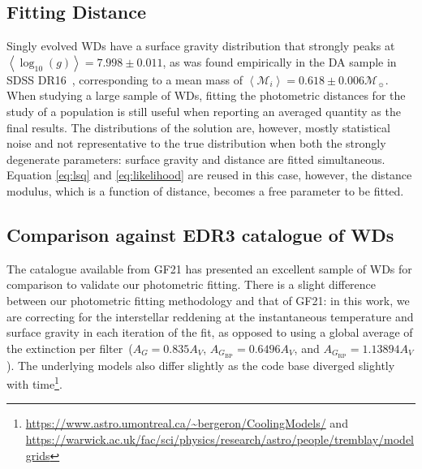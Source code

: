 \documentclass[fleqn,usenatbib]{rasti}
\newcommand{\msun}{\mathcal{M}_{\sun}}
\begin{document}
\subsection{Fitting Distance}
Singly evolved WDs have a surface gravity distribution that
strongly peaks at $\left<\log_{10}(g)\right> = 7.998 \pm 0.011$,
as was found empirically in the DA sample in SDSS DR16~\citep{2021MNRAS.507.4646K},
corresponding to a mean mass of $\left<\mathcal{M}_i\right> = 0.618 \pm 0.006 \msun$.
When studying a large sample of WDs,
fitting the photometric distances for the study of a population is still
useful when reporting an averaged quantity as the final results. The
distributions of the solution are, however, mostly statistical noise and not
representative to the true distribution when both the strongly degenerate
parameters: surface gravity and distance are fitted simultaneous. Equation
\ref{eq:lsq} and \ref{eq:likelihood} are reused in this case, however, the
distance modulus, which is a function of distance, becomes
a free parameter to be fitted.

\subsection{Comparison against EDR3 catalogue of WDs}
\label{sec:gf21_comparison}
The catalogue available from GF21 has presented an excellent sample of WDs for
comparison to validate our photometric fitting. There is a
slight difference between our photometric fitting methodology and that of GF21:
in this work, we are correcting for the interstellar reddening at the
instantaneous temperature and surface gravity in each iteration of the fit,
as opposed to using a global average of the extinction per
filter~($A_{G}=0.835A_{V}$, $A_{G_{\mathrm{BP}}}=0.6496A_{V}$, and
$A_{G_{\mathrm{RP}}}=1.13894A_{V}$). The underlying models
also differ slightly as the code base diverged slightly with
time\footnote{\url{https://www.astro.umontreal.ca/~bergeron/CoolingModels/}
and \url{https://warwick.ac.uk/fac/sci/physics/research/astro/people/tremblay/modelgrids}}.
\end{document}
